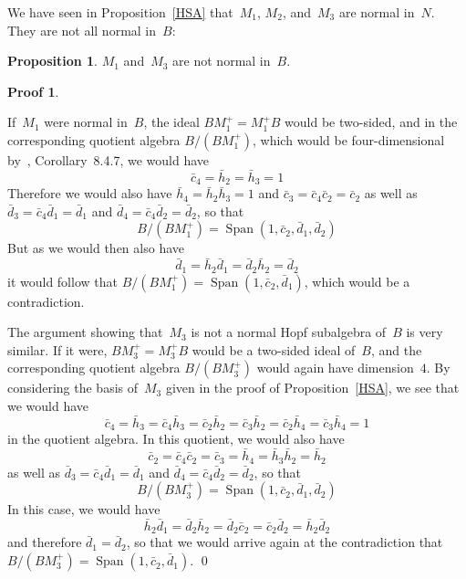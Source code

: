 \documentclass{article}
\newcounter{num}
\newenvironment{pflist}{\begin{list}{(\arabic{num})}{\usecounter{num} \leftmargin0cm \itemindent5pt}}{\end{list}}
\newcounter{num1}
\numberwithin{equation}{section}
\theoremstyle{definition}
\newtheorem*{prop}{Proposition}
\newtheorem*{pf}{Proof}
\theoremstyle{break}
\newcommand{\Span}{\operatorname{Span}}
\newcommand{\1}{{(1)}}
\newcommand{\2}{{(2)}}
\newcommand{\3}{{(3)}}
\begin{document}
We have seen in Proposition~\ref{HSA} that~$M_1$, $M_2$, and~$M_3$ are normal in~$N$. They are not all normal in~$B$:
\begin{prop} \label{notnormal8}
$M_1$ and~$M_3$ are not normal in~$B$.
\end{prop}
\begin{pf}
\begin{pflist}
\item
If~$M_1$ were normal in~$B$, the ideal $B M_1^+ = M_1^+ B$ would be two-sided, and in the corresponding quotient algebra $B/(B M_1^+)$, which would be four-dimensional by~\cite{M}, Corollary~8.4.7, we would have
\[\bar{c}_4 = \bar{h}_2 = \bar{h}_3 = 1\]
Therefore we would also have $\bar{h}_4 = \bar{h}_2 \bar{h}_3 = 1$ and
$\bar{c}_3 = \bar{c}_4 \bar{c}_2 = \bar{c}_2$ as well as
$\bar{d}_3 = \bar{c}_4 \bar{d}_1 = \bar{d}_1$ and $\bar{d}_4 = \bar{c}_4 \bar{d}_2 = \bar{d}_2$, so that
\[B/(B M_1^+) = \Span(1, \bar{c}_2, \bar{d}_1, \bar{d}_2)\]
But as we would then also have
\[\bar{d}_1 = \bar{h}_2 \bar{d}_1 = \bar{d}_2 \bar{h}_2 = \bar{d}_2\]
it would follow that $B/(B M_1^+) = \Span(1, \bar{c}_2, \bar{d}_1)$, which would be a contradiction.

\item
The argument showing that~$M_3$ is not a normal Hopf subalgebra of~$B$ is very similar. If it were, $BM_3^+ = M_3^+ B$ would be a two-sided ideal of~$B$, and the corresponding quotient algebra $B/(B M_3^+)$ would again have dimension~$4$. By considering the basis of~$M_3$ given in the proof of Proposition~\ref{HSA}, we see that we would have
\[\bar{c}_4 = \bar{h}_3 = \bar{c}_4 \bar{h}_3 = \bar{c}_2 \bar{h}_2 = \bar{c}_3 \bar{h}_2
= \bar{c}_2 \bar{h}_4 = \bar{c}_3 \bar{h}_4 = 1\]
in the quotient algebra. In this quotient, we would also have
\[\bar{c}_2 = \bar{c}_4 \bar{c}_2 = \bar{c}_3= \bar{h}_4 = \bar{h}_3 \bar{h}_2 = \bar{h}_2\]
as well as
$\bar{d}_3 = \bar{c}_4 \bar{d}_1 = \bar{d}_1$ and $\bar{d}_4 = \bar{c}_4 \bar{d}_2 = \bar{d}_2$, so that
\[B/(B M_3^+) = \Span(1, \bar{c}_2, \bar{d}_1, \bar{d}_2)\]
In this case, we would have
\[\bar{h}_2 \bar{d}_1 = \bar{d}_2 \bar{h}_2 = \bar{d}_2 \bar{c}_2 = \bar{c}_2 \bar{d}_2 
= \bar{h}_2 \bar{d}_2\]
and therefore $\bar{d}_1 = \bar{d}_2$, so that we would arrive again at the contradiction 
that~$B/(B M_3^+) = \Span(1, \bar{c}_2, \bar{d}_1)$.
\qed
\end{pflist}
\end{pf}
\end{document}
